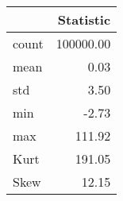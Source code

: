 \begin{tabular}{lr}
\toprule
       &  Statistic \\
\midrule
 count &  100000.00 \\
  mean &       0.03 \\
   std &       3.50 \\
   min &      -2.73 \\
   max &     111.92 \\
  Kurt &     191.05 \\
  Skew &      12.15 \\
\bottomrule
\end{tabular}
